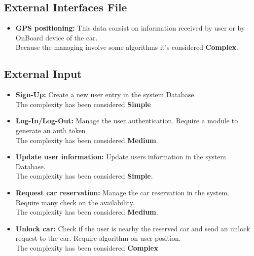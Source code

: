 \subsection{External Interfaces File} 

\begin{itemize}
	\item \textbf{GPS positioning:} This data consist on information received by user or by OnBoard device of the car. \\Because the managing involve some algorithms it's considered \textbf{Complex}.
\end{itemize}


\subsection{External Input} 
\begin{itemize}
	\item \textbf{Sign-Up:} Create a new user entry in the system Database. \\The complexity has been considered \textbf{Simple}
	\item \textbf{Log-In/Log-Out:} Manage the user authentication. Require a module to generate an auth token\\The complexity has been considered \textbf{Medium}.
	\item \textbf{Update user information:} Update users information in the system Database. \\The complexity has been considered \textbf{Simple}.
	\item \textbf{Request car reservation:} Manage the car reservation in the system. Require many check on the availability.  \\The complexity has been considered \textbf{Medium}.
	\item \textbf{Unlock car:} Check if the user is nearby the reserved car and send an unlock request to the car. Require algorithm on user position.  \\The complexity has been considered \textbf{Complex}
\end{itemize}


